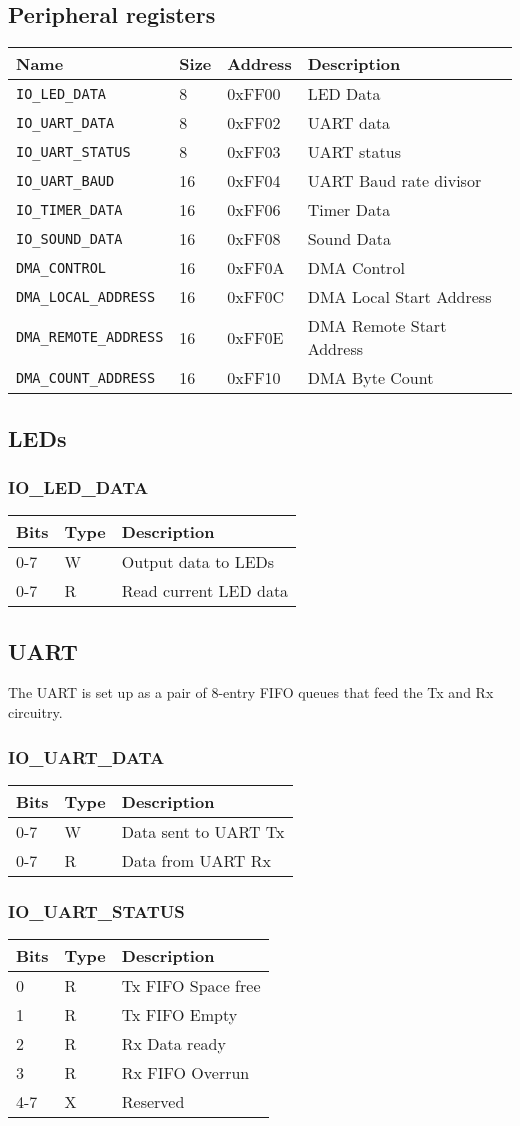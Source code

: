 \documentclass{article}
\newcommand{\regdesc}[2]{
  \subsubsection{#1}
  \begin{tabular}{|l|l|l|}
    \hline
    Bits & Type & Description \\ \hline
    #2
  \end{tabular}
}
\begin{document}
        \subsection{Peripheral registers}
                \begin{tabular}{|l|l|l|l|}
        \hline
        Name & Size & Address & Description \\ \hline
        \verb|IO_LED_DATA| & 8 &0xFF00 & LED Data \\ \hline
        \verb|IO_UART_DATA| & 8 &0xFF02 & UART data \\ \hline
        \verb|IO_UART_STATUS| & 8 & 0xFF03 & UART status \\ \hline
        \verb|IO_UART_BAUD| & 16 & 0xFF04 & UART Baud rate divisor \\ \hline
        \verb|IO_TIMER_DATA| & 16 & 0xFF06 & Timer Data \\ \hline
        \verb|IO_SOUND_DATA| & 16 & 0xFF08 & Sound Data \\ \hline
        \verb|DMA_CONTROL| & 16 & 0xFF0A & DMA Control \\ \hline
        \verb|DMA_LOCAL_ADDRESS| & 16 & 0xFF0C & DMA Local Start Address \\ \hline
        \verb|DMA_REMOTE_ADDRESS| & 16 & 0xFF0E & DMA Remote Start Address \\ \hline
        \verb|DMA_COUNT_ADDRESS| & 16 & 0xFF10 & DMA Byte Count \\ \hline
        
        \end{tabular}


        \subsection{LEDs}
        \regdesc{IO\_LED\_DATA}{
          0-7 & W & Output data to LEDs \\ \hline
          0-7 & R & Read current LED data \\ \hline
        }
        \subsection{UART}
        The UART is set up as a pair of 8-entry FIFO queues that feed
        the Tx and Rx circuitry. \\

        
        \regdesc{IO\_UART\_DATA}{
        0-7 & W & Data sent to UART Tx \\ \hline
        0-7 & R & Data from UART Rx \\ \hline
        }
        \regdesc{IO\_UART\_STATUS}{
        0 & R & Tx FIFO Space free \\ \hline
        1 & R & Tx FIFO Empty \\ \hline
        2 & R & Rx Data ready \\ \hline
        3 & R & Rx FIFO Overrun \\ \hline
        4-7 & X & Reserved \\ \hline
        }
\end{document}
